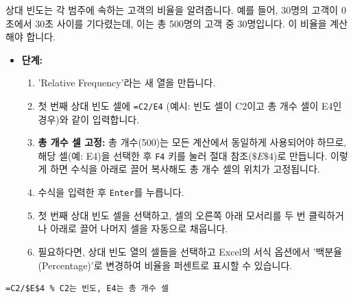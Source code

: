\documentclass[11pt,a4paper]{article}
\theoremstyle{definition}
\begin{document}
\begin{tcolorbox}[title={상대 빈도 계산 (Calculating Relative Frequency)}]
상대 빈도는 각 범주에 속하는 고객의 비율을 알려줍니다. 예를 들어, 30명의 고객이 0초에서 30초 사이를 기다렸는데, 이는 총 500명의 고객 중 30명입니다. 이 비율을 계산해야 합니다.

\begin{itemize}
    \item \textbf{단계:}
    \begin{enumerate}
        \item 'Relative Frequency'라는 새 열을 만듭니다.
        \item 첫 번째 상대 빈도 셀에 \texttt{=C2/E4} (예시: 빈도 셀이 C2이고 총 개수 셀이 E4인 경우)와 같이 입력합니다.
        \item \textbf{총 개수 셀 고정:} 총 개수(500)는 모든 계산에서 동일하게 사용되어야 하므로, 해당 셀(예: E4)을 선택한 후 \texttt{F4} 키를 눌러 절대 참조($\$E\$4$)로 만듭니다. 이렇게 하면 수식을 아래로 끌어 복사해도 총 개수 셀의 위치가 고정됩니다.
        \item 수식을 입력한 후 \texttt{Enter}를 누릅니다.
        \item 첫 번째 상대 빈도 셀을 선택하고, 셀의 오른쪽 아래 모서리를 두 번 클릭하거나 아래로 끌어 나머지 셀을 자동으로 채웁니다.
        \item 필요하다면, 상대 빈도 열의 셀들을 선택하고 Excel의 서식 옵션에서 '백분율 (Percentage)'로 변경하여 비율을 퍼센트로 표시할 수 있습니다.
    \end{enumerate}
\end{itemize}

\begin{lstlisting}[caption={Excel 상대 빈도 계산 예시}, label={lst:excel_relative_frequency}]
=C2/$E$4 % C2는 빈도, E4는 총 개수 셀
\end{lstlisting}


\end{tcolorbox}
\end{document}
